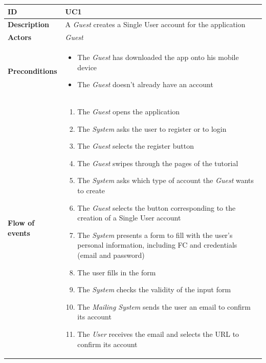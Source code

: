 \documentclass[titlepage]{article}
\begin{document}
			\begin{longtable}{| p{3 cm} | p{10 cm} |} 
			\hline
			{\bf ID} & UC1 \\
			\hline
			{\bf Description} & A {\it Guest} creates a Single User account for the application \\
			\hline
			{\bf Actors} & {\it Guest} \\
			\hline
			{\bf Preconditions} & 		
							\begin{itemize}
								\item The {\it Guest}  has downloaded the app onto his mobile device
								\item The {\it Guest}  doesn’t already have an account
							\end{itemize}
			\\
			\hline
			{\bf Flow of events} & 
							\begin{enumerate}
								\item The {\it Guest} opens the application
								\item The {\it System} asks the user to register or to login
								\item The {\it Guest} selects the register button
								\item The {\it Guest} swipes through the pages of the tutorial
								\item The {\it System}  asks which type of account the {\it Guest} wants to create
								\item The {\it Guest} selects the button corresponding to the creation of a Single 									User account
								\item The {\it System}  presents a form to fill with the user’s personal information, including FC  and credentials (email and password) 
								\item The user fills in the form
								\item The {\it System}  checks the validity of the input form
								\item The {\it Mailing System} sends the user an email to confirm its account
								\item The {\it User} receives the email and selects the URL to confirm its account
							\end{enumerate}
			

\end{longtable}
\end{document}
